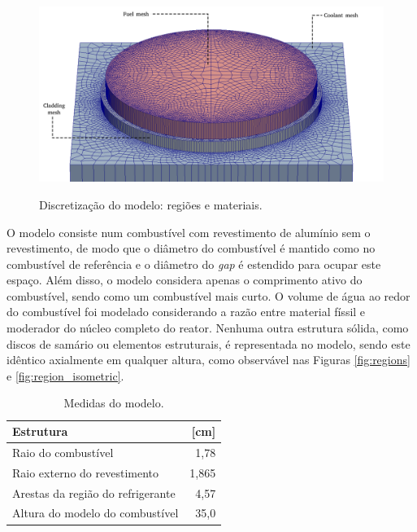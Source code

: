 \begin{figure}[htb]
  \caption{Discretização do modelo: regiões e materiais.}
  \centering\includegraphics[scale=0.5]{figuras/regioes_edges_com_legenda_ingles.png}
  \label{fig:modelo_exploded}
\end{figure}

O modelo consiste num combustível com revestimento de alumínio sem
o revestimento, de modo que o diâmetro do combustível é mantido como no
combustível de referência e o diâmetro do \textit{gap} é estendido para
ocupar este espaço. Além disso, o modelo considera apenas o comprimento
ativo do combustível, sendo como um combustível mais curto. O volume
de água ao redor do combustível foi modelado considerando a razão entre
material físsil e moderador do núcleo completo do reator. Nenhuma outra
estrutura sólida, como discos de samário ou elementos estruturais, é
representada no modelo, sendo este idêntico axialmente em qualquer
altura, como observável nas Figuras \ref{fig:regions} e \ref{fig:region_isometric}.

\begin{table}[htb]
  \centering
  \caption[Medidas do modelo.]{Medidas do modelo.}
  \label{tab:size_model}
  \begin{tabular}{lr}
    Estrutura                         & {[}cm{]} \\ \hline
    Raio do combustível               & 1,78     \\
    Raio externo do revestimento      & 1,865    \\
    Arestas da região do refrigerante & 4,57     \\ \hline
    Altura do modelo do combustível   & 35,0    
  \end{tabular}
\end{table}

